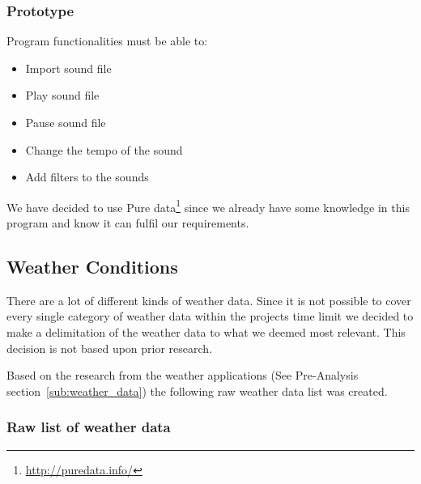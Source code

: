 

\subsubsection{Prototype} %
\label{ssub:prototype}

Program functionalities must be able to:
\begin{itemize}
    \item Import sound file
    \item Play sound file
    \item Pause sound file
    \item Change the tempo of the sound
    \item Add filters to the sounds
\end{itemize}

We have decided to use Pure data\footnote{\url{http://puredata.info/}} since we already have some knowledge in this program and know it can fulfil our requirements. 




\subsection{Weather Conditions} %
\label{sub:weather_conditions}

There are a lot of different kinds of weather data. 
Since it is not possible to cover every single category of weather data within the projects time limit we decided to make a delimitation of the weather data to what we deemed most relevant. This decision is not based upon prior research.

Based on the research from the weather applications (See Pre-Analysis section~\ref{sub:weather_data}) the following raw weather data list was created.

\subsubsection*{Raw list of weather data} %
\label{ssub:raw_list_of_weather_data}

